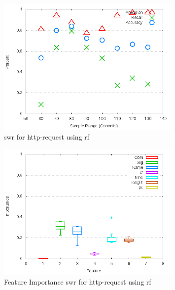 \begin{figure}[!t]
\centering
\includegraphics[width=0.8\textwidth]{images/rf/test_1/http-request_sample_range.png}
\caption{\gls{swr} for http-request using \gls{rf}}
\label{fig:test_1_http-request_rf}
\end{figure}

\begin{figure}[!t]
\centering
\includegraphics[width=0.8\textwidth]{images/rf/test_1/http-request_importance.png}
\caption{Feature Importance \gls{swr} for http-request using \gls{rf}}
\label{fig:test_1_http-request_rf_importance}
\end{figure}

